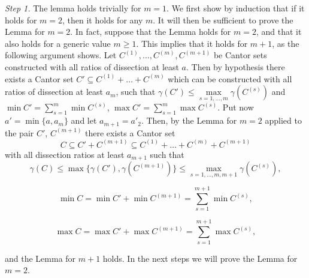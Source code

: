 \documentclass[final,epsfig,amsfont]{article}
\begin{document}
{\em Step 1.}
The lemma holds trivially for $m=1$. We first show by induction that if it holds for $m=2$, then it holds for any $m$. It will then be sufficient to prove the Lemma for $m=2$. In fact, suppose that the
Lemma holds for $m=2$, and that it also holds for a generic value $m\ge 1$. This implies that it holds for $m+1$, as the following argument shows.
Let $C^{(1)},\ldots,C^{(m)}, C^{(m+1)}$ be Cantor sets
constructed with  all ratios of dissection at least $a$. Then by
hypothesis there exists
a Cantor set $C'\subseteq C^{(1)}+\ldots+C^{(m)}$ which can be constructed with all
ratios of dissection at least $a_m$, such that
$\gamma(C')\le\max\limits_{s=1,\ldots,m} \gamma(C^{(s)})$ and $\min
C'=\sum\limits_{s=1}^m \min C^{(s)}$, $\max C'=\sum\limits_{s=1}^m \max C^{(s)}$.
Put now $a'=\min \{a,a_m\}$ and let $a_{m+1}= a'_2$. Then, by the Lemma for $m=2$ applied to the pair $C'$, $C^{(m+1)}$ there exists a  Cantor set
$$C\subseteq C'+C^{(m+1)}\subseteq   C^{(1)}+\ldots+C^{(m)} +C^{(m+1)}$$
with all dissection ratios at least $a_{m+1}$ such that
$$\gamma(C)\le \max\{\gamma(C'), \gamma(C^{(m+1)})\}\le
\max\limits_{s=1,\ldots,m,m+1} \gamma(C^{(s)}),$$

$$\min C=\min C'+\min C^{(m+1)}
=\sum\limits_{s=1}^{m+1} \min C^{(s)},$$

$$\max C=\max C'+\max C^{(m+1)}
=\sum\limits_{s=1}^{m+1} \max C^{(s)},$$

and the Lemma for $m+1$ holds. In the next steps we will prove the Lemma for $m=2$.
\end{document}
